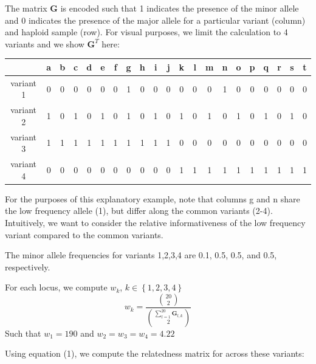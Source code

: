 The matrix $\boldsymbol{G}$ is encoded such that 1 indicates the
presence of the minor allele and 0 indicates the presence of the major
allele for a particular variant (column) and haploid sample (row).
For visual purposes, we limit the calculation to 4 variants and we
show $\boldsymbol{G}^{T}$ here:

\begin{tabular}{|c||c|c|c|c|c|c|c|c|c|c|c|c|c|c|c|c|c|c|c|c|}
\cline{2-21} 
\multicolumn{1}{c|}{} & a & b & c & d & e & f & g & h & i & j & k & l & m & n & o & p & q & r & s & t\tabularnewline
\hline 
variant 1 & 0 & 0 & 0 & 0 & 0 & 0 & 1 & 0 & 0 & 0 & 0 & 0 & 0 & 1 & 0 & 0 & 0 & 0 & 0 & 0\tabularnewline
\hline 
variant 2 & 1 & 0 & 1 & 0 & 1 & 0 & 1 & 0 & 1 & 0 & 1 & 0 & 1 & 0 & 1 & 0 & 1 & 0 & 1 & 0\tabularnewline
\hline 
variant 3 & 1 & 1 & 1 & 1 & 1 & 1 & 1 & 1 & 1 & 1 & 0 & 0 & 0 & 0 & 0 & 0 & 0 & 0 & 0 & 0\tabularnewline
\hline 
variant 4 & 0 & 0 & 0 & 0 & 0 & 0 & 0 & 0 & 0 & 0 & 1 & 1 & 1 & 1 & 1 & 1 & 1 & 1 & 1 & 1\tabularnewline
\hline 
\end{tabular}

For the purposes of this explanatory example, note that columns g
and n share the low frequency allele (1), but differ along the common
variants (2-4). Intuitively, we want to consider the relative informativeness
of the low frequency variant compared to the common variants.

The minor allele frequencies for variants 1,2,3,4 are 0.1, 0.5, 0.5,
and 0.5, respectively. 

For each locus, we compute $w_{k}$, $k\in\left\{ 1,2,3,4\right\} $
\[
w_{k}=\frac{{20 \choose 2}}{{\sum_{l=1}^{20}\boldsymbol{G}_{l,k} \choose 2}}
\]
Such that $w_{1}=190$ and $w_{2}=w_{3}=w_{4}=4.22$

Using equation (1), we compute the relatedness matrix for across these
variants:

